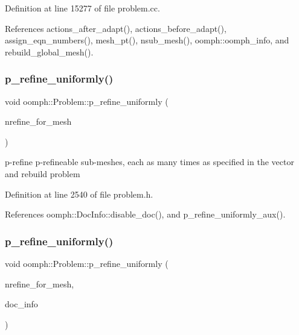 Definition at line 15277 of file problem.\+cc.



References actions\+\_\+after\+\_\+adapt(), actions\+\_\+before\+\_\+adapt(), assign\+\_\+eqn\+\_\+numbers(), mesh\+\_\+pt(), nsub\+\_\+mesh(), oomph\+::oomph\+\_\+info, and rebuild\+\_\+global\+\_\+mesh().

\mbox{\label{classoomph_1_1Problem_a3aaea4b1be43f5d4bb187a8c6d3ca16f}} 
\subsubsection{\texorpdfstring{p\+\_\+refine\+\_\+uniformly()}{p\_refine\_uniformly()}\hspace{0.1cm}{\footnotesize\ttfamily [1/6]}}
{\footnotesize\ttfamily void oomph\+::\+Problem\+::p\+\_\+refine\+\_\+uniformly (\begin{DoxyParamCaption}\item[{const \hyperlink{classoomph_1_1Vector}{Vector}$<$ unsigned $>$ \&}]{nrefine\+\_\+for\+\_\+mesh }\end{DoxyParamCaption})\hspace{0.3cm}{\ttfamily [inline]}}



p-\/refine p-\/refineable sub-\/meshes, each as many times as specified in the vector and rebuild problem 



Definition at line 2540 of file problem.\+h.



References oomph\+::\+Doc\+Info\+::disable\+\_\+doc(), and p\+\_\+refine\+\_\+uniformly\+\_\+aux().

\mbox{\label{classoomph_1_1Problem_a0a980d9659db60b113b6d4e7431594b7}} 
\subsubsection{\texorpdfstring{p\+\_\+refine\+\_\+uniformly()}{p\_refine\_uniformly()}\hspace{0.1cm}{\footnotesize\ttfamily [2/6]}}
{\footnotesize\ttfamily void oomph\+::\+Problem\+::p\+\_\+refine\+\_\+uniformly (\begin{DoxyParamCaption}\item[{const \hyperlink{classoomph_1_1Vector}{Vector}$<$ unsigned $>$ \&}]{nrefine\+\_\+for\+\_\+mesh,  }\item[{\hyperlink{classoomph_1_1DocInfo}{Doc\+Info} \&}]{doc\+\_\+info }\end{DoxyParamCaption})\hspace{0.3cm}{\ttfamily [inline]}}



